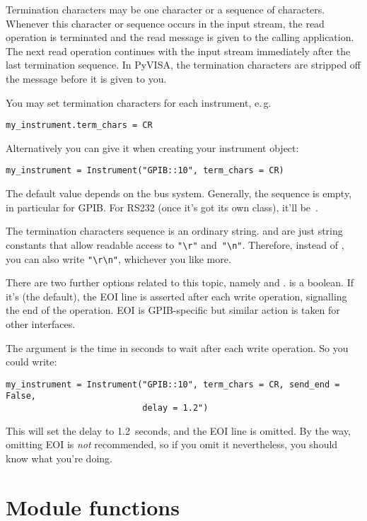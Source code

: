 \documentclass{howto}
\begin{document}
Termination characters may be one character or a sequence of characters.
Whenever this character or sequence occurs in the input stream, the read
operation is terminated and the read message is given to the calling
application.  The next read operation continues with the input stream
immediately after the last termination sequence.  In PyVISA, the termination
characters are stripped off the message before it is given to you.

You may set termination characters for each instrument, e.\,g.
\begin{verbatim}
my_instrument.term_chars = CR
\end{verbatim}
Alternatively you can give it when creating your instrument object:
\begin{verbatim}
my_instrument = Instrument("GPIB::10", term_chars = CR)
\end{verbatim}
The default value depends on the bus system.  Generally, the sequence is empty,
in particular for GPIB\@.  For RS232 (once it's got its own class), it'll
be~\@.

The termination characters sequence is an ordinary string.   and
 are just string constants that allow readable access to \verb|"\r"|
and~\verb|"\n"|.  Therefore, instead of , you can also write
\verb|"\r\n"|, whichever you like more.

There are two further options related to this topic, namely  and
.   is a boolean.  If it's  (the
default), the EOI line is asserted after each write operation, signalling the
end of the operation.  EOI is GPIB-specific but similar action is taken for
other interfaces.

The argument  is the time in seconds to wait after each write
operation.  So you could write:
\begin{verbatim}
my_instrument = Instrument("GPIB::10", term_chars = CR, send_end = False,
                           delay = 1.2")
\end{verbatim}
This will set the delay to 1.2~seconds, and the EOI line is omitted.  By the
way, omitting EOI is \emph{not} recommended, so if you omit it nevertheless,
you should know what you're doing.


\section{Module functions}
\end{document}
